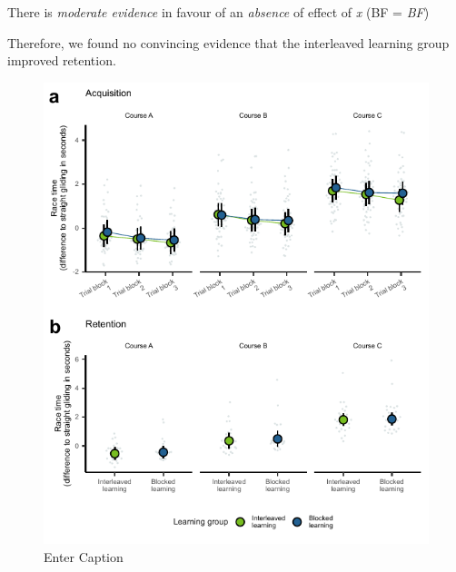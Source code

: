 There is \textit{moderate evidence} in favour of an \textit{absence} of effect of \textit{x} (BF = \textit{BF}) 


Therefore, we found no convincing evidence that the interleaved learning group improved retention.

\begin{figure}
    \centering
    \includegraphics[width=1\linewidth]{figure/figure_results_ci_acquisitionandretention.pdf}
    \caption{Enter Caption}
    \label{fig:ci_results}
\end{figure}

